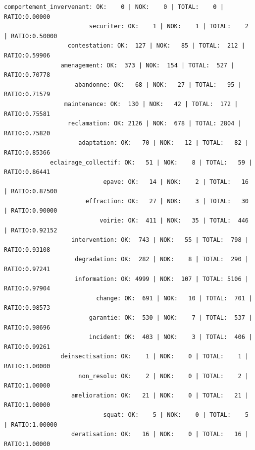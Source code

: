\begin{lstlisting}
comportement_invervenant: OK:    0 | NOK:    0 | TOTAL:    0 | RATIO:0.00000
                        securiter: OK:    1 | NOK:    1 | TOTAL:    2 | RATIO:0.50000
                  contestation: OK:  127 | NOK:   85 | TOTAL:  212 | RATIO:0.59906
                amenagement: OK:  373 | NOK:  154 | TOTAL:  527 | RATIO:0.70778
                    abandonne: OK:   68 | NOK:   27 | TOTAL:   95 | RATIO:0.71579
                 maintenance: OK:  130 | NOK:   42 | TOTAL:  172 | RATIO:0.75581
                  reclamation: OK: 2126 | NOK:  678 | TOTAL: 2804 | RATIO:0.75820
                     adaptation: OK:   70 | NOK:   12 | TOTAL:   82 | RATIO:0.85366
             eclairage_collectif: OK:   51 | NOK:    8 | TOTAL:   59 | RATIO:0.86441
                            epave: OK:   14 | NOK:    2 | TOTAL:   16 | RATIO:0.87500
                       effraction: OK:   27 | NOK:    3 | TOTAL:   30 | RATIO:0.90000
                           voirie: OK:  411 | NOK:   35 | TOTAL:  446 | RATIO:0.92152
                   intervention: OK:  743 | NOK:   55 | TOTAL:  798 | RATIO:0.93108
                    degradation: OK:  282 | NOK:    8 | TOTAL:  290 | RATIO:0.97241
                    information: OK: 4999 | NOK:  107 | TOTAL: 5106 | RATIO:0.97904
                          change: OK:  691 | NOK:   10 | TOTAL:  701 | RATIO:0.98573
                        garantie: OK:  530 | NOK:    7 | TOTAL:  537 | RATIO:0.98696
                        incident: OK:  403 | NOK:    3 | TOTAL:  406 | RATIO:0.99261
                deinsectisation: OK:    1 | NOK:    0 | TOTAL:    1 | RATIO:1.00000
                     non_resolu: OK:    2 | NOK:    0 | TOTAL:    2 | RATIO:1.00000
                   amelioration: OK:   21 | NOK:    0 | TOTAL:   21 | RATIO:1.00000
                            squat: OK:    5 | NOK:    0 | TOTAL:    5 | RATIO:1.00000
                   deratisation: OK:   16 | NOK:    0 | TOTAL:   16 | RATIO:1.00000
\end{lstlisting}

